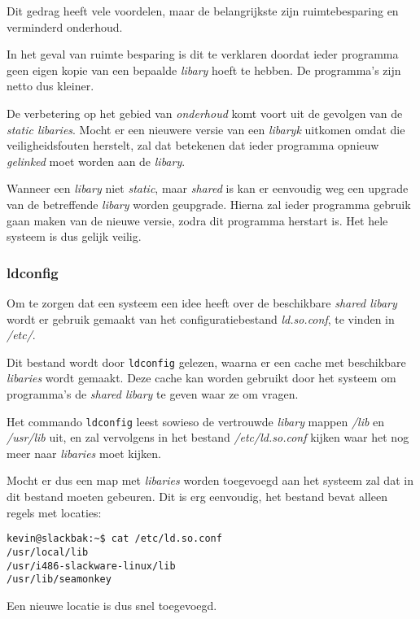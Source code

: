 Dit gedrag heeft vele voordelen, maar de belangrijkste zijn ruimtebesparing en verminderd onderhoud. 

In het geval van ruimte besparing is dit te verklaren doordat ieder programma geen eigen kopie van een bepaalde \emph{libary} hoeft te hebben. De programma's zijn netto dus kleiner. 

De verbetering op het gebied van \emph{onderhoud} komt voort uit de gevolgen van de \emph{static libaries}. Mocht er een nieuwere versie van een \emph{libaryk} uitkomen omdat die veiligheidsfouten herstelt, zal dat betekenen dat ieder programma opnieuw \emph{gelinked} moet worden aan de \emph{libary}. 

Wanneer een \emph{libary} niet \emph{static}, maar \emph{shared} is kan er eenvoudig weg een upgrade van de betreffende \emph{libary} worden geupgrade. Hierna zal ieder programma gebruik gaan maken van de nieuwe versie, zodra dit programma herstart is. Het hele systeem is dus gelijk veilig. 

\subsubsection{ldconfig}
Om te zorgen dat een systeem een idee heeft over de beschikbare \emph{shared libary} wordt er gebruik gemaakt van het configuratiebestand \emph{ld.so.conf}, te vinden in \emph{/etc/}. 

Dit bestand wordt door \texttt{ldconfig} gelezen, waarna er een cache met beschikbare \emph{libaries} wordt gemaakt. Deze cache kan worden gebruikt door het systeem om programma's de \emph{shared libary} te geven waar ze om vragen. 

Het commando \texttt{ldconfig} leest sowieso de vertrouwde \emph{libary} mappen \emph{/lib} en \emph{/usr/lib} uit, en zal vervolgens in het bestand \emph{/etc/ld.so.conf} kijken waar het nog meer naar \emph{libaries} moet kijken. 

Mocht er dus een map met \emph{libaries} worden toegevoegd aan het systeem zal dat in dit bestand moeten gebeuren. Dit is erg eenvoudig, het bestand bevat alleen regels met locaties:
\begin{lstlisting}
kevin@slackbak:~$ cat /etc/ld.so.conf 
/usr/local/lib
/usr/i486-slackware-linux/lib
/usr/lib/seamonkey
\end{lstlisting}%
Een nieuwe locatie is dus snel toegevoegd. 
